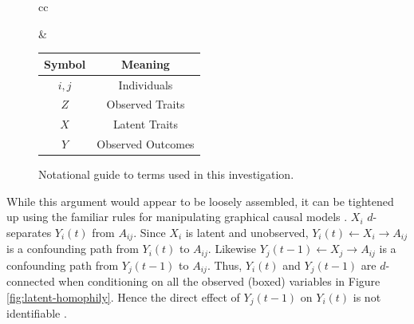 \documentclass{article}
\begin{document}
\begin{multicols}{2}
\begin{figure}
\begin{center}
\begin{tabular}{cc}
\begin{minipage}[b]{0.5\linewidth}\centering
{}
\caption{Causal graph allowing for latent variables ($X$) to influence both
  manifest network ties $A_{ij}$ and manifest behaviors ($Y$).}
\label{fig:latent-homophily}
\end{minipage}

&
\hspace{0.2cm}

\begin{minipage}[b]{0.42\linewidth}\centering
\begin{tabular}{cc}
Symbol & Meaning \\
\hline
$i,j$ & Individuals \\
$Z$ & Observed Traits \\
$X$ & Latent Traits \\
$Y$ & Observed Outcomes
\end{tabular}
\vspace{1.5cm}
\caption{Notational guide to terms used in this
  investigation.\label{table:terminology}}
\end{minipage}
\end{tabular}
\end{center}
\end{figure}

While this argument would appear to be loosely assembled, it can be tightened
up using the familiar rules for manipulating graphical causal models
\citep{Spirtes-Glymour-Scheines, Pearl-causality-2nd}.  $X_i$ $d$-separates
$Y_i(t)$ from $A_{ij}$.  Since $X_i$ is latent and unobserved, $Y_i(t)
\leftarrow X_i \rightarrow A_{ij}$ is a confounding path from $Y_i(t)$ to
$A_{ij}$.  Likewise $Y_j(t-1) \leftarrow X_j \rightarrow A_{ij}$ is a
confounding path from $Y_j(t-1)$ to $A_{ij}$.  Thus, $Y_i(t)$ and $Y_j(t-1)$
are $d$-connected when conditioning on all the observed (boxed) variables in
Figure \ref{fig:latent-homophily}.  Hence the direct effect of $Y_j(t-1)$ on
$Y_i(t)$ is not identifiable \citep[\S 3.5, pp. 93--94]{Pearl-causality-2nd}.


\end{multicols}
\end{document}
